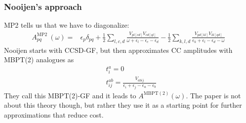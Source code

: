 \begin{frame}
\frametitle{Nooijen's approach}
MP2 tells us that we have to diagonalize:
\begin{align}
A_{p q}^{\text {MP2 }}(\omega)
= & \epsilon_{p} \delta_{p q}+\frac{1}{2} \sum_{l, c, d} \frac{V_{p l[c d]} V_{c d[q l]}}{\omega+\epsilon_{l}-\epsilon_{c}-\epsilon_{d}}
-\frac{1}{2} \sum_{k, l, d} \frac{V_{p d[k l]} V_{k l[q d]}}{\epsilon_{k}+\epsilon_{l}-\epsilon_{d}-\omega}
\end{align}
Nooijen starts with CCSD-GF, but then approximates CC amplitudes with MBPT(2) analogues as
\begin{align*}
& t_{i}^{a}=0 \\
& t_{i j}^{a b}=\frac{V_{a b i j}}{\epsilon_{i}+\epsilon_{j}-\epsilon_{a}-\epsilon_{b}}
\end{align*}
They call this MBPT(2)-GF and it leads to $A^{\mathrm{MBPT(2)}}(\omega)$. The paper is not about this theory though, but rather they use it as a starting point for further approximations that reduce cost.
\end{frame}
